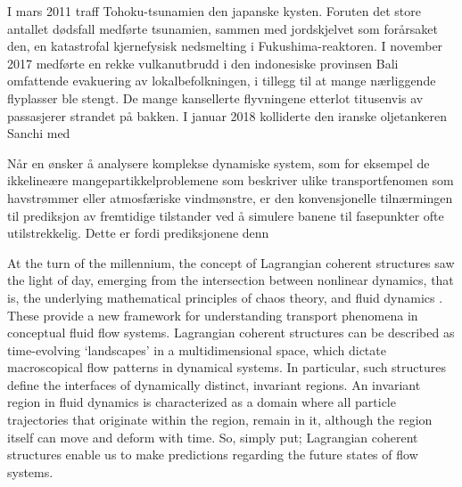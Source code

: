 I mars 2011 traff Tohoku-tsunamien den japanske kysten. Foruten det store
antallet dødsfall medførte tsunamien, sammen med jordskjelvet som forårsaket
den, en katastrofal kjernefysisk nedsmelting i Fukushima-reaktoren. I
november 2017 medførte en rekke vulkanutbrudd i den indonesiske provinsen
Bali omfattende evakuering av lokalbefolkningen, i tillegg til at mange
nærliggende flyplasser ble stengt. De mange kansellerte flyvningene etterlot
titusenvis av passasjerer strandet på bakken. I januar 2018 kolliderte den
iranske oljetankeren Sanchi med

Når en ønsker å analysere komplekse dynamiske system, som for eksempel de
ikkelineære mangepartikkelproblemene som beskriver ulike transportfenomen
som havstrømmer eller atmosfæriske vindmønstre, er den konvensjonelle
tilnærmingen til prediksjon av fremtidige tilstander ved å simulere
banene til fasepunkter ofte utilstrekkelig. Dette er fordi prediksjonene
denn


At the turn of the millennium, the concept of Lagrangian coherent structures
saw the light of day, emerging from the intersection between nonlinear dynamics,
that is, the underlying mathematical principles of chaos theory, and fluid
dynamics \parencite{haller2000lagrangian}. These provide a new framework for
understanding transport phenomena in conceptual fluid flow systems. Lagrangian
coherent structures can be described as time-evolving `landscapes' in a
multidimensional space, which dictate macroscopical flow patterns in dynamical
systems. In particular, such structures define the interfaces of dynamically
distinct, invariant regions. An invariant region in fluid dynamics is
characterized as a domain where all particle trajectories that originate within
the region, remain in it, although the region itself can move and deform with
time. So, simply put; Lagrangian coherent structures enable us to make
predictions regarding the future states of flow systems.

